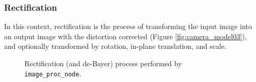 \subsubsection{Rectification}
\label{sec:rectification}

In this context, rectification is the process of transforming the input image into an output image with the distortion corrected (Figure \ref{fig:camera_model03}), and optionally transformed by rotation, in-plane translation, and scale.

\begin{figure}[!htbp]
\centering
  \caption{Rectification (and de-Bayer) process performed by \texttt{\texttt{image\_proc}\_node}.}
   \label{fig:rectification}
\end{figure}
